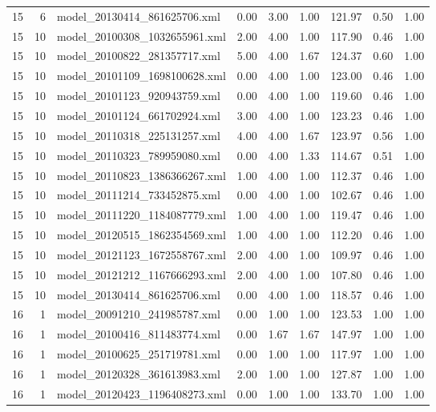 \begin{table}[ht]
\begin{tabular}{rrlrrrrrr}
   15 &   6 & model\_20130414\_861625706.xml & 0.00 & 3.00 & 1.00 & 121.97 & 0.50 & 1.00 \\ 
   15 &  10 & model\_20100308\_1032655961.xml & 2.00 & 4.00 & 1.00 & 117.90 & 0.46 & 1.00 \\ 
   15 &  10 & model\_20100822\_281357717.xml & 5.00 & 4.00 & 1.67 & 124.37 & 0.60 & 1.00 \\ 
   15 &  10 & model\_20101109\_1698100628.xml & 0.00 & 4.00 & 1.00 & 123.00 & 0.46 & 1.00 \\ 
   15 &  10 & model\_20101123\_920943759.xml & 0.00 & 4.00 & 1.00 & 119.60 & 0.46 & 1.00 \\ 
   15 &  10 & model\_20101124\_661702924.xml & 3.00 & 4.00 & 1.00 & 123.23 & 0.46 & 1.00 \\ 
   15 &  10 & model\_20110318\_225131257.xml & 4.00 & 4.00 & 1.67 & 123.97 & 0.56 & 1.00 \\ 
   15 &  10 & model\_20110323\_789959080.xml & 0.00 & 4.00 & 1.33 & 114.67 & 0.51 & 1.00 \\ 
   15 &  10 & model\_20110823\_1386366267.xml & 1.00 & 4.00 & 1.00 & 112.37 & 0.46 & 1.00 \\ 
   15 &  10 & model\_20111214\_733452875.xml & 0.00 & 4.00 & 1.00 & 102.67 & 0.46 & 1.00 \\ 
   15 &  10 & model\_20111220\_1184087779.xml & 1.00 & 4.00 & 1.00 & 119.47 & 0.46 & 1.00 \\ 
   15 &  10 & model\_20120515\_1862354569.xml & 1.00 & 4.00 & 1.00 & 112.20 & 0.46 & 1.00 \\ 
   15 &  10 & model\_20121123\_1672558767.xml & 2.00 & 4.00 & 1.00 & 109.97 & 0.46 & 1.00 \\ 
   15 &  10 & model\_20121212\_1167666293.xml & 2.00 & 4.00 & 1.00 & 107.80 & 0.46 & 1.00 \\ 
   15 &  10 & model\_20130414\_861625706.xml & 0.00 & 4.00 & 1.00 & 118.57 & 0.46 & 1.00 \\ 
   16 &   1 & model\_20091210\_241985787.xml & 0.00 & 1.00 & 1.00 & 123.53 & 1.00 & 1.00 \\ 
   16 &   1 & model\_20100416\_811483774.xml & 0.00 & 1.67 & 1.67 & 147.97 & 1.00 & 1.00 \\ 
   16 &   1 & model\_20100625\_251719781.xml & 0.00 & 1.00 & 1.00 & 117.97 & 1.00 & 1.00 \\ 
   16 &   1 & model\_20120328\_361613983.xml & 2.00 & 1.00 & 1.00 & 127.87 & 1.00 & 1.00 \\ 
   16 &   1 & model\_20120423\_1196408273.xml & 0.00 & 1.00 & 1.00 & 133.70 & 1.00 & 1.00 \\ 

\end{tabular}
\end{table}
